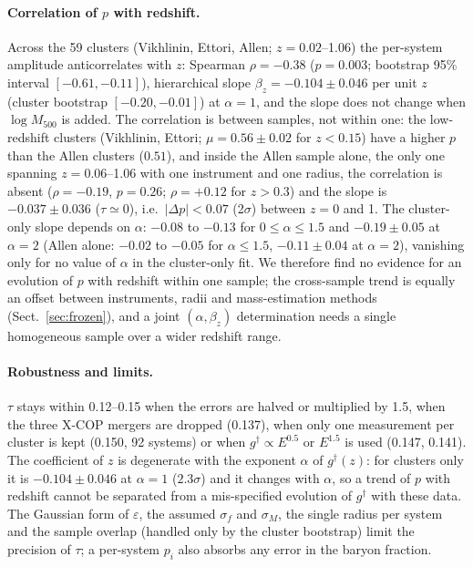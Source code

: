 \documentclass[11pt,a4paper]{article}
\newcommand{\gdag}{g^{\dagger}}
\begin{document}
\paragraph{Correlation of $p$ with redshift.} Across the 59 clusters (Vikhlinin, Ettori, Allen; $z=0.02$--1.06) the per-system amplitude anticorrelates with $z$: Spearman $\rho=-0.38$ ($p=0.003$; bootstrap 95\% interval $[-0.61,-0.11]$), hierarchical slope $\beta_z=-0.104\pm0.046$ per unit $z$ (cluster bootstrap $[-0.20,-0.01]$) at $\alpha=1$, and the slope does not change when $\log M_{500}$ is added. The correlation is between samples, not within one: the low-redshift clusters (Vikhlinin, Ettori; $\mu=0.56\pm0.02$ for $z<0.15$) have a higher $p$ than the Allen clusters ($0.51$), and inside the Allen sample alone, the only one spanning $z=0.06$--1.06 with one instrument and one radius, the correlation is absent ($\rho=-0.19$, $p=0.26$; $\rho=+0.12$ for $z>0.3$) and the slope is $-0.037\pm0.036$ ($\tau\simeq0$), i.e.\ $|\Delta p|<0.07$ (2$\sigma$) between $z=0$ and 1. The cluster-only slope depends on $\alpha$: $-0.08$ to $-0.13$ for $0\le\alpha\le1.5$ and $-0.19\pm0.05$ at $\alpha=2$ (Allen alone: $-0.02$ to $-0.05$ for $\alpha\le1.5$, $-0.11\pm0.04$ at $\alpha=2$), vanishing only for no value of $\alpha$ in the cluster-only fit. We therefore find no evidence for an evolution of $p$ with redshift within one sample; the cross-sample trend is equally an offset between instruments, radii and mass-estimation methods (Sect.~\ref{sec:frozen}), and a joint $(\alpha,\beta_z)$ determination needs a single homogeneous sample over a wider redshift range.

\paragraph{Robustness and limits.} $\tau$ stays within 0.12--0.15 when the errors are halved or multiplied by 1.5, when the three X-COP mergers are dropped (0.137), when only one measurement per cluster is kept (0.150, 92 systems) or when $\gdag\propto E^{0.5}$ or $E^{1.5}$ is used (0.147, 0.141). The coefficient of $z$ is degenerate with the exponent $\alpha$ of $\gdag(z)$: for clusters only it is $-0.104\pm0.046$ at $\alpha=1$ ($2.3\sigma$) and it changes with $\alpha$, so a trend of $p$ with redshift cannot be separated from a mis-specified evolution of $\gdag$ with these data. The Gaussian form of $\varepsilon$, the assumed $\sigma_f$ and $\sigma_M$, the single radius per system and the sample overlap (handled only by the cluster bootstrap) limit the precision of $\tau$; a per-system $p_i$ also absorbs any error in the baryon fraction.
\end{document}
